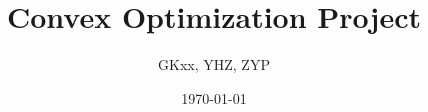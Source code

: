 \documentclass{beamer}
\title{Convex Optimization Project}
\author{GKxx, YHZ, ZYP}
\date{\today}
\begin{document}
\begin{frame}
    \maketitle
\end{frame}
\end{document}
